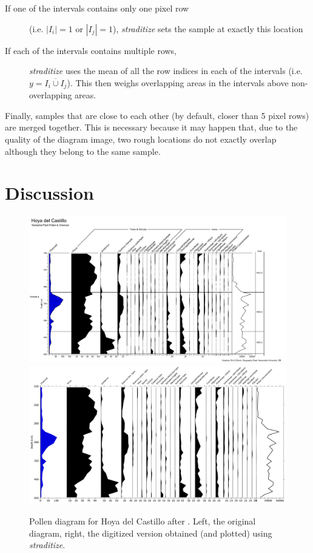 \begin{refsection}
\begin{description}
	\item[If one of the intervals contains only one pixel row] (i.e. $\left| I_i \right| = 1$ or $\left| I_j \right| = 1$), \emph{straditize} sets the sample at exactly this location
	\item[If each of the intervals contains multiple rows,] \emph{straditize} uses the mean of all the row indices in each of the intervals (i.e. $y = \overline{I_i \cup I_j}$). This then weighs overlapping areas in the intervals above non-overlapping areas.
\end{description}

Finally, samples that are close to each other (by default, closer than 5 pixel rows) are merged together. This is necessary because it may happen that, due to the quality of the diagram image, two rough locations do not exactly overlap although they belong to the same sample.


\setcounter{secnumdepth}{2}
\endgroup

\section{Discussion}  \label{sec:straditize-discussion}

\begin{figure}
	\centering
	\includegraphics[width=0.45\linewidth]{straditize-figures/hoya-del-castillo.pdf}
	\includegraphics[width=0.45\linewidth]{straditize-figures/hoya-del-castillo-digitized.pdf}
	\caption[Pollen diagram for Hoya del Castillo]{Pollen diagram for Hoya del Castillo after \cite{DavisStevenson2007}. Left,  the original diagram, right, the digitized version obtained (and plotted) using \emph{straditize}.}
	\label{fig:hoya-del-castillo}
\end{figure}


\end{refsection}
